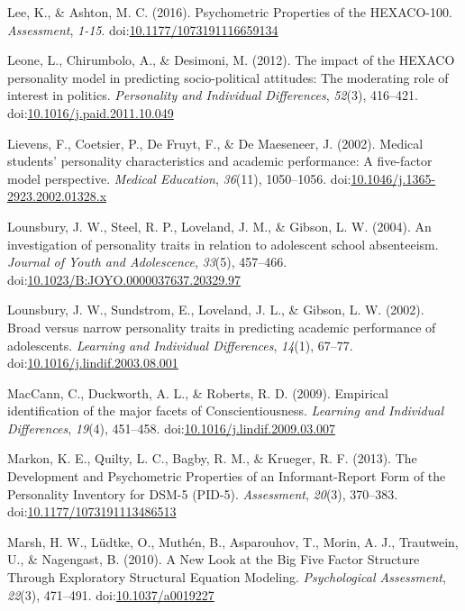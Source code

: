 \documentclass[,man,floatsintext]{apa6}
\begin{document}
\hypertarget{ref-Lee2016}{}
Lee, K., \& Ashton, M. C. (2016). Psychometric Properties of the
HEXACO-100. \emph{Assessment}, \emph{1-15}.
doi:\href{https://doi.org/10.1177/1073191116659134}{10.1177/1073191116659134}

\hypertarget{ref-Leone2012}{}
Leone, L., Chirumbolo, A., \& Desimoni, M. (2012). The impact of the
HEXACO personality model in predicting socio-political attitudes: The
moderating role of interest in politics. \emph{Personality and
Individual Differences}, \emph{52}(3), 416--421.
doi:\href{https://doi.org/10.1016/j.paid.2011.10.049}{10.1016/j.paid.2011.10.049}

\hypertarget{ref-Lievens2002}{}
Lievens, F., Coetsier, P., De Fruyt, F., \& De Maeseneer, J. (2002).
Medical students' personality characteristics and academic performance:
A five-factor model perspective. \emph{Medical Education},
\emph{36}(11), 1050--1056.
doi:\href{https://doi.org/10.1046/j.1365-2923.2002.01328.x}{10.1046/j.1365-2923.2002.01328.x}

\hypertarget{ref-Lounsbury2004}{}
Lounsbury, J. W., Steel, R. P., Loveland, J. M., \& Gibson, L. W.
(2004). An investigation of personality traits in relation to adolescent
school absenteeism. \emph{Journal of Youth and Adolescence},
\emph{33}(5), 457--466.
doi:\href{https://doi.org/10.1023/B:JOYO.0000037637.20329.97}{10.1023/B:JOYO.0000037637.20329.97}

\hypertarget{ref-Lounsbury2002}{}
Lounsbury, J. W., Sundstrom, E., Loveland, J. L., \& Gibson, L. W.
(2002). Broad versus narrow personality traits in predicting academic
performance of adolescents. \emph{Learning and Individual Differences},
\emph{14}(1), 67--77.
doi:\href{https://doi.org/10.1016/j.lindif.2003.08.001}{10.1016/j.lindif.2003.08.001}

\hypertarget{ref-MacCann2009}{}
MacCann, C., Duckworth, A. L., \& Roberts, R. D. (2009). Empirical
identification of the major facets of Conscientiousness. \emph{Learning
and Individual Differences}, \emph{19}(4), 451--458.
doi:\href{https://doi.org/10.1016/j.lindif.2009.03.007}{10.1016/j.lindif.2009.03.007}

\hypertarget{ref-Markon2013}{}
Markon, K. E., Quilty, L. C., Bagby, R. M., \& Krueger, R. F. (2013).
The Development and Psychometric Properties of an Informant-Report Form
of the Personality Inventory for DSM-5 (PID-5). \emph{Assessment},
\emph{20}(3), 370--383.
doi:\href{https://doi.org/10.1177/1073191113486513}{10.1177/1073191113486513}

\hypertarget{ref-Marsh2010}{}
Marsh, H. W., Lüdtke, O., Muthén, B., Asparouhov, T., Morin, A. J.,
Trautwein, U., \& Nagengast, B. (2010). A New Look at the Big Five
Factor Structure Through Exploratory Structural Equation Modeling.
\emph{Psychological Assessment}, \emph{22}(3), 471--491.
doi:\href{https://doi.org/10.1037/a0019227}{10.1037/a0019227}
\end{document}

